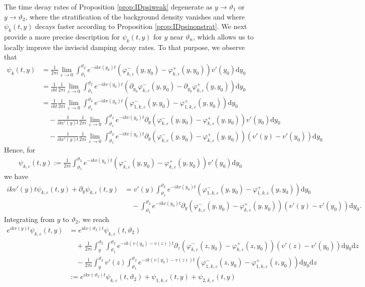 \documentclass[11pt,reqno]{amsproc}
\theoremstyle{definition}
\numberwithin{equation}{section}
\renewcommand{\d}{\mathrm{d}}
\newcommand{\ep}{\varepsilon}
\begin{document}
The time decay rates of Proposition \ref{prop:IDpsiweak} degenerate as $y\rightarrow\vartheta_1$ or $y\rightarrow\vartheta_2$, where the stratification of the background density vanishes and where $\psi_k(t,y)$ decays faster according to Proposition \ref{prop:IDpsinonstrat}. We next provide a more precise description for $\psi_k(t,y)$ for $y$ near $\vartheta_n$, which allows us to locally improve the inviscid damping decay rates. To that purpose, we observe that
\begin{align*}
\psi_k(t,y) &= \frac{1}{2\pi i}\lim_{\ep\rightarrow 0}\int_{\vartheta_1}^{\vartheta_2}e^{-ikv(y_0)t}\left( \varphi_{k,\ep}^-(y,y_0) - \varphi_{k,\ep}^+(y,y_0) \right) v'(y_0) \d y_0 \\
&=\frac{1}{ikt} \frac{1}{2\pi i}\lim_{\ep\rightarrow 0}\int_{\vartheta_1}^{\vartheta_2}e^{-ikv(y_0)t} \left( \partial_{y_0}\varphi_{k,\ep}^-(y,y_0) - \partial_{y_0}\varphi_{k,\ep}^+(y,y_0) \right) \d y_0 \\
&= \frac{1}{ikt}\frac{1}{2\pi i}\lim_{\ep\rightarrow 0}\int_{\vartheta_1}^{\vartheta_2}e^{-ikv(y_0)t} \left( \varphi_{1,k,\ep}^-(y,y_0) - \varphi_{1,k,\ep}^+(y,y_0) \right) \d y_0 \\
&\quad - \frac{1}{ikv'(y) t}\frac{1}{2\pi i} \lim_{\ep\rightarrow 0}\int_{\vartheta_1}^{\vartheta_2}e^{-ikv(y_0)t} \partial_y \left( \varphi_{k,\ep}^-(y,y_0) - \varphi_{k,\ep}^+(y,y_0) \right)v'(y_0) \d y_0 \\
&\quad -\frac{1}{ikv'(y) t}\frac{1}{2\pi i} \lim_{\ep\rightarrow 0}\int_{\vartheta_1}^{\vartheta_2}e^{-ikv(y_0)t} \partial_y \left( \varphi_{k,\ep}^-(y,y_0) - \varphi_{k,\ep}^+(y,y_0) \right)(v'(y)-v'(y_0)) \d y_0 
\end{align*}
Hence, for 
\begin{align*}
\psi_{k,\ep}(t,y) := \frac{1}{2\pi i }\int_{\vartheta_1}^{\vartheta_2}e^{-ikv(y_0)t}\left( \varphi_{k,\ep}^-(y,y_0) - \varphi_{k,\ep}^+(y,y_0) \right) v'(y_0) \d y_0 
\end{align*}
we have
\begin{align*}
ikv'(y)t \psi_{k,\ep}(t,y) + \partial_y \psi_{k,\ep}(t,y) &= v'(y)\int_{\vartheta_1}^{\vartheta_2}e^{-ikv(y_0)t} \left( \varphi_{1,k,\ep}^-(y,y_0) - \varphi_{1,k,\ep}^+(y,y_0) \right) \d y_0 \\
&\quad- \int_{\vartheta_1}^{\vartheta_2}e^{-ikv(y_0)t} \partial_y \left( \varphi_{k,\ep}^-(y,y_0) - \varphi_{k,\ep}^+(y,y_0) \right)(v'(y)-v'(y_0)) \d y_0.
\end{align*}
Integrating from $y$ to $\vartheta_2$, we reach
\begin{align*}
e^{ikv(y)t}\psi_{k,\ep}(t,y) &= e^{ikv(\vartheta_2)t}\psi_{k,\ep}(t,\vartheta_2) \\
&\quad + \frac{1}{2\pi i}\int_{y}^{\vartheta_2}\int_{\vartheta_1}^{\vartheta_2} e^{-ik(v(y_0)-v(z)) t}\partial_z \left( \varphi_{k,\ep}^-(z,y_0) - \varphi_{k,\ep}^+(z,y_0) \right) (v'(z) - v'(y_0) ) \d y_0\d z\\
&\quad - \frac{1}{2\pi i}\int_y^{\vartheta_2} v'(z) \int_{\vartheta_1}^{\vartheta_2}e^{-ik(v(y_0)-v(z))t} \left( \varphi_{1,k,\ep}^-(z,y_0) - \varphi_{1,k,\ep}^+(z,y_0) \right) \d y_0 \d z \\
&:=e^{ikv(\vartheta_2)t}\psi_{k,\ep}(t,\vartheta_2) + \psi_{1,k,\ep}(t,y) + \psi_{2,k,\ep}(t,y)
\end{align*}
\end{document}
